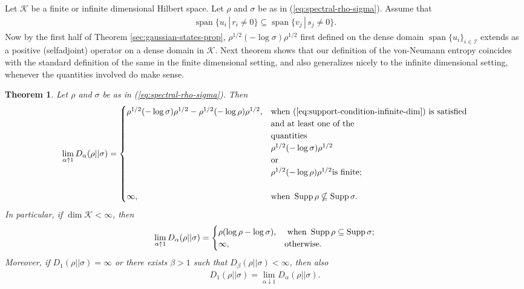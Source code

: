 \documentclass[12pt,a4paper,oneside]{article}
\numberwithin{equation}{section}
\theoremstyle{definition}  %
\theoremstyle{plain}  %
\newtheorem{thm}[defn]{Theorem}
\theoremstyle{remark} %
\newcommand{\CK}{\mathcal{K}}
\let\tr\relax
\DeclareMathOperator{\tr}{Tr}
\DeclareMathOperator{\supp}{Supp}
\DeclareMathOperator{\spn}{span}
\begin{document}
  Let $\CK $ be a finite or infinite dimensional Hilbert space. Let  $\rho $ and  $\sigma$ be as in (\ref{eq:spectral-rho-sigma}).
 Assume that \begin{align}
    \label{eq:support-condition-infinite-dim}
    \spn \{u_i\,|\,r_i\neq 0 \}\subseteq \spn \{v_j\,|\,s_j\neq 0\}.
\end{align}
 Now by the first half of Theorem \ref{sec:gaussian-states-prop}, $\rho^{1/2}(-\log \sigma)\rho^{1/2}$ first defined on the dense domain $\spn\{u_i\}_{i\in \mathcal{I}} $ extends as a positive (selfadjoint) operator on a dense domain in $\CK $. Next theorem shows that our definition of the von-Neumann entropy coincides with the standard definition of the same in the finite dimensional setting, and also generalizes nicely to the infinite dimensional setting, whenever the quantities involved do make sense.
  \begin{thm}\label{thm:von-Neumann-entropy}Let $\rho$ and $\sigma$ be as in (\ref{eq:spectral-rho-sigma}).
Then 
 \begin{align}\label{eq:vn-entropy}
     \lim_{\alpha\uparrow 1} D_{\alpha}(\rho||\sigma)= \begin{cases}
     \tr \rho^{1/2}(-\log\sigma)\rho^{1/2}-\tr\rho^{1/2}(-\log\rho)\rho^{1/2},  &\text{when } (\ref{eq:support-condition-infinite-dim}) \text{ is satisfied} \\
      &\text{and at least one of the  }\\
   &\text{quantities }\\
   &\tr \rho^{1/2}(-\log\sigma)\rho^{1/2}\\
   &\textnormal{or } \\&\tr \rho^{1/2}(-\log\rho)\rho^{1/2} \text{is finite;}\\
   &\\
       \infty, & \text{when } \supp \rho \nsubseteq \supp \sigma.\\
     \end{cases}
 \end{align}
 In particular, if $\dim \CK <\infty $,  then \begin{align}
   \lim_{\alpha\uparrow 1} D_{\alpha}(\rho||\sigma) =\begin{cases}
       \tr \rho(\log \rho -\log \sigma),& \text{ when } \supp \rho \subseteq \supp \sigma;\\
       \infty, & \text{otherwise}.
     \end{cases} 
 \end{align}
 Moreover, if $D_1(\rho||\sigma) = \infty$ or there exists $\beta>1$ such that $D_{\beta}(\rho||\sigma)<\infty$, then also \begin{align}\label{eq:vn-entropy-equals-right-limit}
     D_1(\rho||\sigma)  = \lim\limits_{\alpha\downarrow 1}D_{\alpha}(\rho||\sigma).
 \end{align}
 \end{thm}
\end{document}
